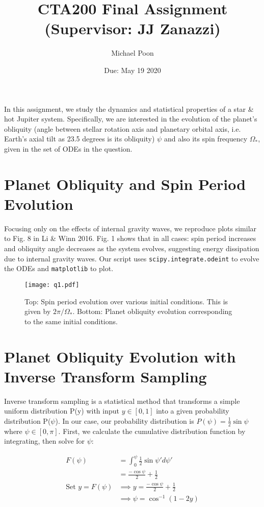 \documentclass{article}
\title{CTA200 Final Assignment (Supervisor: JJ Zanazzi)}
\author{Michael Poon}
\date{Due: May 19 2020}
\begin{document}
\maketitle

In this assignment, we study the dynamics and statistical properties of a star \& hot Jupiter system. Specifically, we are interested in the evolution of the planet's obliquity (angle between stellar rotation axis and planetary orbital axis, i.e. Earth's axial tilt as 23.5 degrees is its obliquity) $\psi$ and also its spin frequency $\Omega_*$, given in the set of ODEs in the question.

\section{Planet Obliquity and Spin Period Evolution}
Focusing only on the effects of internal gravity waves, we reproduce plots similar to Fig. 8 in Li \& Winn 2016. Fig. 1 shows that in all cases: spin period increases and obliquity angle decreases as the system evolves, suggesting energy dissipation due to internal gravity waves. Our script uses \texttt{scipy.integrate.odeint} to evolve the ODEs and \texttt{matplotlib} to plot.

\begin{figure}[H]
    \centering
    \texttt{[image: q1.pdf]}
    \caption{Top: Spin period evolution over various initial conditions. This is given by $2\pi/\Omega_*$. Bottom: Planet obliquity evolution corresponding to the same initial conditions.}
\end{figure}

\section{Planet Obliquity Evolution with Inverse Transform Sampling}
Inverse transform sampling is a statistical method that transforms a simple uniform distribution P(y) with input $y\in[0,1]$ into a given probability distribution P($\psi$). In our case, our probability distribution is $P(\psi)=\frac{1}{2}\sin{\psi}$ where $\psi \in [0,\pi]$. First, we calculate the cumulative distribution function by integrating, then solve for $\psi$:

\begin{align*}
    F(\psi) &= \int_0^\psi{\frac{1}{2}\sin{\psi'}d\psi'} \\
    &=\frac{-\cos{\psi}}{2}+\frac{1}{2} \\
    \text{Set $y = F(\psi)$} &\implies y = \frac{-\cos{\psi}}{2}+\frac{1}{2} \\
    &\implies \psi = \cos^{-1}{(1-2y)}
\end{align*}
\end{document}
